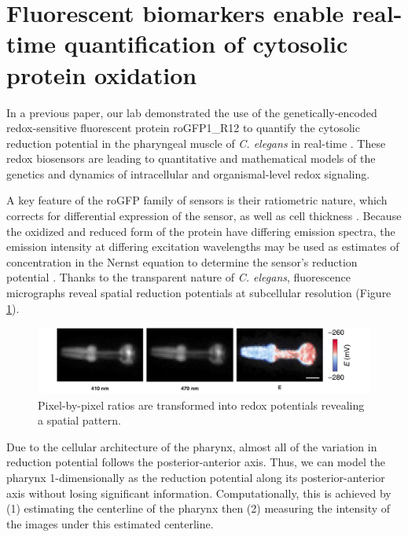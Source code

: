 \section{Fluorescent biomarkers enable real-time quantification of cytosolic protein oxidation} \label{fluorescenceIntro}
In a previous paper, our lab demonstrated the use of the genetically-encoded redox-sensitive fluorescent protein roGFP1\_R12 to quantify the cytosolic reduction potential in the pharyngeal muscle of \textit{C. elegans} in real-time \cite{cata2014}. These redox biosensors are leading to quantitative and mathematical models of the genetics and dynamics of intracellular and organismal-level redox signaling.

A key feature of the roGFP family of sensors is their ratiometric nature, which corrects for differential expression of the sensor, as well as cell thickness \cite{hanson2004}. Because the oxidized and reduced form of the protein have differing emission spectra, the emission intensity at differing excitation wavelengths may be used as estimates of concentration in the Nernst equation to determine the sensor's reduction potential \cite{meyer2010}. Thanks to the transparent nature of \textit{C. elegans}, fluorescence micrographs reveal spatial reduction potentials at subcellular resolution (Figure \ref{fig:ratioImageToE}).

\begin{figure}[ht]
    \centering
    \includegraphics[scale=.25]{Figures/rendered_files/ratios_to_e}
    \decoRule
    \caption[Ratios of images to reduction potential]{Pixel-by-pixel ratios are transformed into redox potentials revealing a spatial pattern.}
    \label{fig:ratioImageToE}
\end{figure}

Due to the cellular architecture of the pharynx, almost all of the variation in reduction potential follows the posterior-anterior axis. Thus, we can model the pharynx 1-dimensionally as the reduction potential along its posterior-anterior axis without losing significant information. Computationally, this is achieved by (1) estimating the centerline of the pharynx then (2) measuring the intensity of the images under this estimated centerline.

